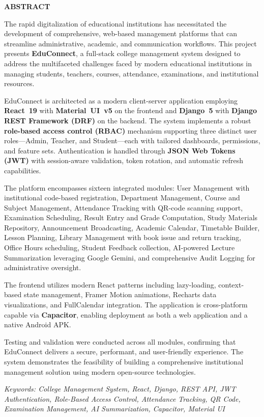\newpage
\begin{center}
  \textbf{\large 
  \bf{ABSTRACT}}  
\end{center}

\hline
\vspace{0.5cm}

The rapid digitalization of educational institutions has necessitated the development of comprehensive, web-based management platforms that can streamline administrative, academic, and communication workflows. This project presents \textbf{EduConnect}, a full-stack college management system designed to address the multifaceted challenges faced by modern educational institutions in managing students, teachers, courses, attendance, examinations, and institutional resources.

EduConnect is architected as a modern client-server application employing \textbf{React~19} with \textbf{Material~UI~v5} on the frontend and \textbf{Django~5} with \textbf{Django REST Framework (DRF)} on the backend. The system implements a robust \textbf{role-based access control (RBAC)} mechanism supporting three distinct user roles---Admin, Teacher, and Student---each with tailored dashboards, permissions, and feature sets. Authentication is handled through \textbf{JSON Web Tokens (JWT)} with session-aware validation, token rotation, and automatic refresh capabilities.

The platform encompasses sixteen integrated modules: User Management with institutional code-based registration, Department Management, Course and Subject Management, Attendance Tracking with QR-code scanning support, Examination Scheduling, Result Entry and Grade Computation, Study Materials Repository, Announcement Broadcasting, Academic Calendar, Timetable Builder, Lesson Planning, Library Management with book issue and return tracking, Office Hours scheduling, Student Feedback collection, AI-powered Lecture Summarization leveraging Google Gemini, and comprehensive Audit Logging for administrative oversight.

The frontend utilizes modern React patterns including lazy-loading, context-based state management, Framer Motion animations, Recharts data visualizations, and FullCalendar integration. The application is cross-platform capable via \textbf{Capacitor}, enabling deployment as both a web application and a native Android APK.

Testing and validation were conducted across all modules, confirming that EduConnect delivers a secure, performant, and user-friendly experience. The system demonstrates the feasibility of building a comprehensive institutional management solution using modern open-source technologies.

\vspace{0.5cm}
\emph{Keywords: College Management System, React, Django, REST API, JWT Authentication, Role-Based Access Control, Attendance Tracking, QR Code, Examination Management, AI Summarization, Capacitor, Material UI}
